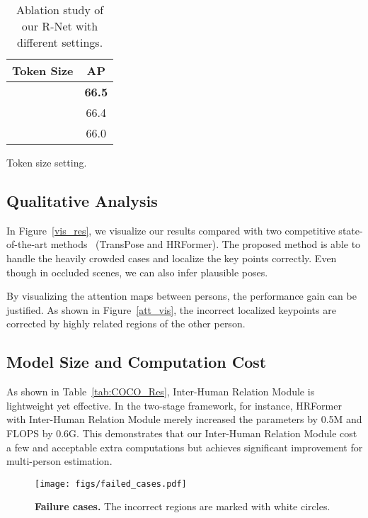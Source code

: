 \documentclass{article}
\begin{document}
\begin{table}[h]
\begin{subtable}[h]{0.22\textwidth}
		\centering
		\begin{tabular}{c|c}
        \toprule
        Token Size & AP   \\ 
        \midrule
              & \textbf{66.5} \\
               & 66.4 \\
                   & 66.0 \\ 
        \bottomrule
        \end{tabular}
		\caption{Token size setting.}
		\label{tab:label subtable D}
	\end{subtable}
	\caption{Ablation study of our R-Net with different settings.}
	\label{tab:Ablation_Study}
\end{table}



\subsection{Qualitative Analysis}
In Figure~\ref{vis_res}, we visualize our results compared with two competitive state-of-the-art methods ~(TransPose and HRFormer). The proposed method is able to handle the heavily crowded cases and localize the key points correctly. Even though in occluded scenes, we can also infer plausible poses.

By visualizing the attention maps between persons, the performance gain can be justified. As shown in Figure~\ref{att_vis}, the incorrect localized keypoints are corrected by highly related regions of the other person.









\subsection{Model Size and Computation Cost}
As shown in Table~\ref{tab:COCO_Res}, Inter-Human Relation Module is lightweight yet effective. In the two-stage framework, for instance, HRFormer with Inter-Human Relation Module merely increased the parameters by 0.5M and FLOPS by 0.6G. This demonstrates that our Inter-Human Relation Module cost a few and acceptable extra computations but achieves significant improvement for multi-person estimation. 


\begin{figure}
    \centering
    \texttt{[image: figs/failed\_cases.pdf]}
    \caption{\textbf{Failure cases.} The incorrect regions are marked with white circles.}
    \label{fig:failure}
    \vspace{-2mm}
\end{figure}
\end{document}
